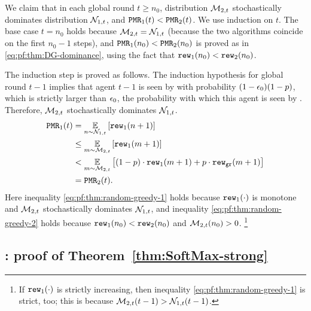 We claim that in each global round $t\geq n_0$, distribution $\mathcal{M}_{2,t}$ stochastically dominates distribution $\mathcal{N}_{1,t}$, and $\mathtt{PMR}_1(t)<\mathtt{PMR}_2(t)$. We use induction on $t$. The base case $t=n_0$ holds because $\mathcal{M}_{2,t} = \mathcal{N}_{1,t}$ (because the two algorithms coincide on the first $n_0-1$ steps), and $\mathtt{PMR}_1(n_0)<\mathtt{PMR}_2(n_0)$ is proved as in \eqref{eq:pf:thm:DG-dominance}, using the fact that $\mathtt{rew}_1(n_0)<\mathtt{rew}_2(n_0)$.

The induction step is proved as follows. The induction hypothesis for global round $t-1$ implies that agent $t-1$ is seen by \alg with probability $(1-\epsilon_0)(1-p)$, which is strictly larger than $\epsilon_0$, the probability with which this agent is seen by \alg[2]. Therefore, $\mathcal{M}_{2,t}$ stochastically dominates $\mathcal{N}_{1,t}$.
\begin{align}
\mathtt{PMR}_1(t)
  &= \operatorname*{\mathbb{E}}_{n\sim \mathcal{N}_{1,t}}\left[\mathtt{rew}_1(n+1)\right] \nonumber \\
  &\leq \operatorname*{\mathbb{E}}_{m\sim \mathcal{M}_{2,t}}\left[\mathtt{rew}_1(m+1)\right]
    \label{eq:pf:thm:random-greedy-1}\\
  &< \operatorname*{\mathbb{E}}_{m\sim \mathcal{M}_{2,t}}\left[(1-p)\cdot \mathtt{rew}_1(m+1) + p\cdot \mathtt{rew}_{\texttt{gr}}(m+1)\right]
    \label{eq:pf:thm:random-greedy-2} \\
  &= \mathtt{PMR}_2(t). \nonumber
\end{align}
Here inequality \eqref{eq:pf:thm:random-greedy-1} holds because $\mathtt{rew}_1(\cdot)$ is monotone and $\mathcal{M}_{2,t}$ stochastically dominates $\mathcal{N}_{1,t}$, and inequality \eqref{eq:pf:thm:random-greedy-2} holds because $\mathtt{rew}_1(n_0)<\mathtt{rew}_2(n_0)$ and $\mathcal{M}_{2,t}(n_0)>0$.%
\footnote{If $\mathtt{rew}_1(\cdot)$ is strictly increasing, then inequality \eqref{eq:pf:thm:random-greedy-1} is strict, too; this is because $\mathcal{M}_{2,t}(t-1)>\mathcal{N}_{1,t}(t-1)$.  }



\subsection{\SoftMaxRandom: proof of Theorem~\ref{thm:SoftMax-strong}}
\label{sec:proofs-SoftMax}

